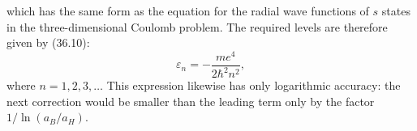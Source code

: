 which has the same form as the equation for the radial wave functions of $s$ states in the three-dimensional Coulomb problem. The required levels are therefore given by (36.10):
\begin{equation}
 \varepsilon_n=-\frac{me^4}{2\hbar^2n^2},
 \tag{10}
\end{equation}
where $n=1,2,3,\ldots$ This expression likewise has only logarithmic accuracy: the next correction would be smaller than the leading term only by the factor $1/\ln(a_B/a_H)$.

